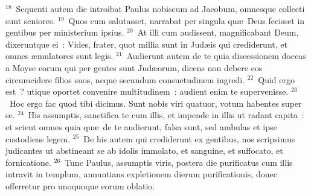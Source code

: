 ${}^{18}$~Sequenti autem die introibat Paulus nobiscum ad Jacobum, omnesque collecti sunt seniores.
${}^{19}$~Quos cum salutasset, narrabat per singula qu\ae\ Deus fecisset in gentibus per ministerium ipsius.
${}^{20}$~At illi cum audissent, magnificabant Deum, dixeruntque ei~: Vides, frater, quot millia sunt in Jud\ae is qui crediderunt, et omnes \ae mulatores sunt legis.
${}^{21}$~Audierunt autem de te quia discessionem doceas a Moyse eorum qui per gentes sunt Jud\ae orum, dicens non debere eos circumcidere filios suos, neque secundum consuetudinem ingredi.
${}^{22}$~Quid ergo est~? utique oportet convenire multitudinem~: audient enim te supervenisse.
${}^{23}$~Hoc ergo fac quod tibi dicimus. Sunt nobis viri quatuor, votum habentes super se.
${}^{24}$~His assumptis, sanctifica te cum illis, et impende in illis ut radant capita~: et scient omnes quia qu\ae\ de te audierunt, falsa sunt, sed ambulas et ipse custodiens legem.
${}^{25}$~De his autem qui crediderunt ex gentibus, nos scripsimus judicantes ut abstineant se ab idolis immolato, et sanguine, et suffocato, et fornicatione.
${}^{26}$~Tunc Paulus, assumptis viris, postera die purificatus cum illis intravit in templum, annuntians expletionem dierum purificationis, donec offerretur pro unoquoque eorum oblatio.


